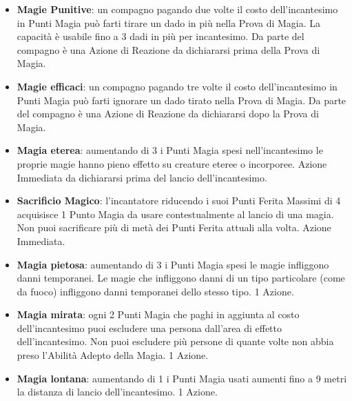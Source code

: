 \documentclass[landscape,10pt,a4paper]{article}
\begin{document}
\begin{multicols}{2}
\begin{dmbox}[title=Alterare la Magia - pagina \pageref{magiealteraremagie}]
\begin{itemize}[leftmargin=0.5cm,itemsep=-1pt,parsep=0pt]

\item  \textbf{Magie Punitive}: un compagno pagando due volte il costo dell'incantesimo in Punti Magia può farti tirare un dado in più nella Prova di Magia. La capacità è usabile fino a 3 dadi in più per incantesimo. Da parte del compagno è una Azione di Reazione da dichiararsi prima della Prova di Magia.

\item  \textbf{Magie efficaci}: un compagno pagando tre volte il costo dell'incantesimo in Punti Magia può farti ignorare un dado tirato nella Prova di Magia. Da parte del compagno è una Azione di Reazione da dichiararsi dopo la Prova di Magia.

\item \textbf{Magia eterea}: aumentando di 3 i Punti Magia spesi nell'incantesimo le proprie magie hanno pieno effetto su creature eteree o incorporee. Azione Immediata da dichiararsi prima del lancio dell'incantesimo.

\item \textbf{Sacrificio Magico}: l'incantatore riducendo i suoi Punti Ferita Massimi di 4 acquisisce 1 Punto Magia da usare contestualmente al lancio di una magia. Non puoi sacrificare più di metà dei Punti Ferita attuali alla volta. Azione Immediata.

\item \textbf{Magia pietosa}: aumentando di 3 i Punti Magia spesi le magie infliggono danni temporanei.
Le magie che infliggono danni di un tipo particolare (come da fuoco) infliggono danni temporanei dello stesso tipo. 1 Azione.

\item \textbf{Magia mirata}: ogni 2 Punti Magia che paghi in aggiunta al costo dell'incantesimo puoi escludere una persona dall'area di effetto dell'incantesimo. Non puoi escludere più persone di quante volte non abbia preso l'Abilità Adepto della Magia. 1 Azione. %

\item \textbf{Magia lontana}: aumentando di 1 i Punti Magia usati aumenti fino a 9 metri la distanza di lancio dell'incantesimo. 1 Azione.


\end{itemize}
\end{dmbox}
\end{multicols}
\end{document}
